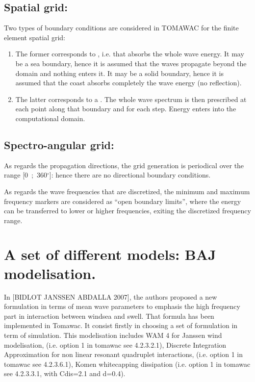 \subsection{ Spatial grid:}

 Two types of boundary conditions are considered in TOMAWAC for the finite element spatial grid:

\begin{enumerate}
\item  The former corresponds to , i.e. that absorbs the whole wave energy. It may be a sea boundary, hence it is assumed that the waves propagate beyond the domain and nothing enters it. It may be a solid boundary, hence it is assumed that the coast absorbs completely the wave energy (no reflection).

\item  The latter corresponds to a . The whole wave spectrum is then prescribed at each point along that boundary and for each step. Energy enters into the computational domain.
\end{enumerate}


\subsection{ Spectro-angular grid:}

 As regards the propagation directions, the grid generation is periodical over the range [0~;~360${}^\circ$]: hence there are no directional boundary conditions.

 As regards the wave frequencies that are discretized, the minimum and maximum frequency markers are considered as ``open boundary limits'', where the energy can be transferred to lower or higher frequencies, exiting the discretized frequency range.


\section{ A set of different models: BAJ modelisation. }

 In [BIDLOT JANSSEN ABDALLA 2007], the authors proposed a new formulation in terms of mean wave parameters to emphasis the high frequency part in interaction between windsea and swell. That formula has been implemented in Tomawac. It consist firstly in choosing a set of formulation in term of simulation. This modelisation includes WAM 4 for Janssen wind modelisation, (i.e. option 1 in tomawac see 4.2.3.2.1), Discrete Integration Approximation for non linear resonant quadruplet interactions, (i.e. option 1 in tomawac see 4.2.3.6.1), Komen whitecapping dissipation (i.e. option 1 in tomawac see 4.2.3.3.1, with Cdis=2.1 and d=0.4).

